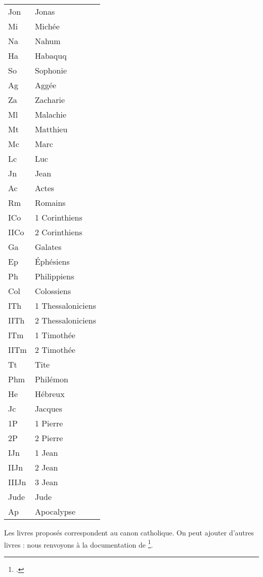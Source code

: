 \begin{longtable}{|l|l|}
Jon    &    Jonas\\
Mi    &    Michée\\
Na    &    Nahum\\
Ha    &    Habaquq\\
So    &    Sophonie\\
Ag    &    Aggée\\
Za    &    Zacharie\\
Ml    &    Malachie\\
Mt    &    Matthieu\\
Mc    &    Marc\\
Lc    &    Luc\\
Jn    &    Jean\\
Ac    &    Actes\\
Rm    &    Romains\\
ICo    &    1 Corinthiens\\
IICo    &    2 Corinthiens\\
Ga    &    Galates\\
Ep    &    Éphésiens\\
Ph    &    Philippiens\\
Col    &    Colossiens\\
ITh    &    1 Thessaloniciens\\
IITh    &    2 Thessaloniciens\\
ITm    &    1 Timothée\\
IITm    &    2 Timothée\\
Tt    &    Tite\\
Phm    &    Philémon\\
He    &    Hébreux\\
Jc    &    Jacques\\
1P    &    1 Pierre\\
2P    &    2 Pierre\\
IJn    &    1 Jean\\
IIJn    &    2 Jean\\
IIIJn    &    3 Jean\\
Jude    &    Jude\\
Ap    &    Apocalypse\\
\end{longtable}

\begin{plusloins}
Les livres proposés correspondent au canon catholique. On peut ajouter d'autres livres : nous renvoyons à la documentation de \footcite{bibleref_nouveauxlivres}.


\end{plusloins}

